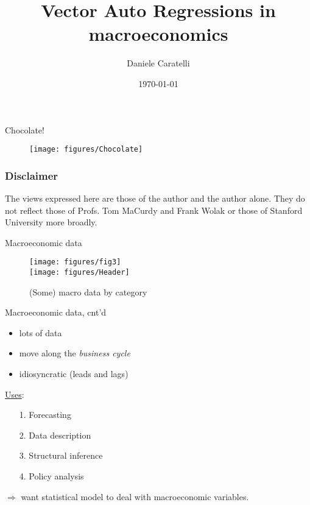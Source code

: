 \documentclass{beamer}
\title{Vector Auto Regressions in macroeconomics}
\author{Daniele Caratelli}
\institute{Stanford University}
\date{\today}
\begin{document}
	\newcommand{\semitransp}[2][35]{\color{fg!#1}#2}
	\frame{\titlepage}
	
	\begin{frame}{Chocolate!}
		\begin{figure}
		\centering
		\texttt{[image: figures/Chocolate]}
		\end{figure}

	\end{frame}
	
	\begin{frame}
		\frametitle{Disclaimer}
		The views expressed here are those of the author and the author alone. They do not reflect those of Profs. Tom MaCurdy and Frank Wolak or those of Stanford University more broadly.	
	\end{frame}
	
	\begin{frame}{Macroeconomic data}
	\begin{figure}
		\centering
		\texttt{[image: figures/fig3]}\\
		\texttt{[image: figures/Header]}
		\caption{(Some) macro data by category}
		\label{fig:fig3}
	\end{figure}
	\end{frame}

	\begin{frame}{Macroeconomic data, cnt'd}
		\begin{itemize}
			\item lots of data
			\item move along the \textit{business cycle}
			\item idiosyncratic (leads and lags)
		\end{itemize}
			\pause
			\vspace*{1em}				
			\underline{Uses}:
			\begin{itemize}
				\item[1.] Forecasting
				\item[2.] Data description
				\item[3.] Structural inference
				\item[4.] Policy analysis
			\end{itemize}
			\pause
			\vspace*{1em}
		$\Rightarrow$ want statistical model to deal with macroeconomic variables.			
	\end{frame}
	
\end{document}
